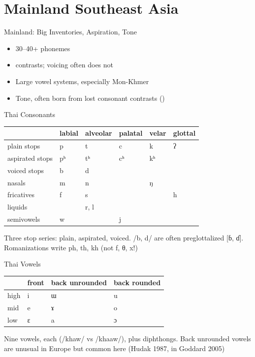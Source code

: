 \documentclass{beamer}
\begin{document}
\section{Mainland Southeast Asia}

\begin{frame}{Mainland: Big Inventories, Aspiration, Tone}
  \Large
  \begin{itemize}
  \item 30--40+ phonemes
  \item {} contrasts; voicing often does not
  \item Large vowel systems, especially Mon-Khmer
  \item Tone, often born from lost consonant contrasts ()
  \end{itemize}
\end{frame}

\begin{frame}{Thai Consonants}
  \large
  \begin{tabular}{llllll}
    \toprule
    & labial & alveolar & palatal & velar & glottal \\
    \midrule
    plain stops     & p   & t   & c   & k   & ʔ \\
    aspirated stops & pʰ  & tʰ  & cʰ  & kʰ  & \\
    voiced stops    & b   & d   &     &     & \\
    nasals          & m   & n   &     & ŋ   & \\
    fricatives      & f   & s   &     &     & h \\
    liquids         &     & r, l &    &     & \\
    semivowels      & w   &     & j   &     & \\
    \bottomrule
  \end{tabular}
  \vfill
  \normalsize
  Three stop series: plain, aspirated, voiced.  /b, d/ are often
  preglottalized [ɓ, ɗ].  Romanizations write ph, th, kh (not f, θ, x!)
\end{frame}

\begin{frame}{Thai Vowels}
  \Large
  \begin{tabular}{llll}
    \toprule
    & front & back unrounded & back rounded \\
    \midrule
    high & i & \alert{ɯ} & u \\
    mid  & e & \alert{ɤ} & o \\
    low  & ɛ & a         & ɔ \\
    \bottomrule
  \end{tabular}
  \vfill
  \normalsize
  Nine vowels, each  (/khaw/ vs /khaaw/), plus diphthongs.
  Back unrounded vowels are unusual in Europe but common here
  (Hudak 1987, in Goddard 2005)
\end{frame}
\end{document}
